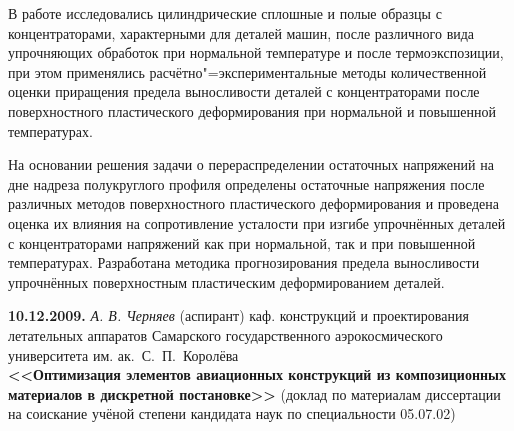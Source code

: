 {В работе исследовались цилиндрические сплошные и полые образцы с
концентраторами, характерными для деталей машин, после различного вида
упрочняющих обработок при нормальной температуре и после
термоэкспозиции, при этом применялись расчётно"=экспериментальные методы
количественной оценки приращения предела выносливости деталей с
концентраторами после поверхностного пластического деформирования при
нормальной и повышенной температурах.

На основании решения задачи о перераспределении остаточных
напряжений на дне надреза полукруглого профиля определены остаточные
напряжения после различных методов поверхностного пластического
деформирования и проведена оценка их влияния на сопротивление
усталости при изгибе упрочнённых деталей с концентраторами напряжений как
при нормальной, так и при повышенной температурах. 
Разработана методика прогнозирования предела выносливости упрочнённых
поверхностным пластическим деформированием деталей.

}



\bigskip

\noindent
{\bf 10.12.2009.} {\it А. В. Черняев} {\footnotesize (аспирант) каф. конструкций и проектирования летательных аппаратов  Самарского государственного аэрокосмического университета им. ак.~С.~П.~Королёва} \\
{\bf <<Оптимизация элементов авиационных конструкций из композиционных материалов в дискретной постановке>> } {\footnotesize (доклад по материалам диссертации на соискание учёной степени кандидата наук по специальности 05.07.02)}

\smallskip


